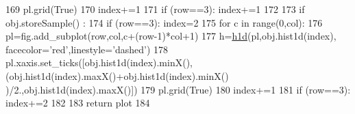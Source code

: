 \begin{DoxyCode}
169             pl.grid(\textcolor{keyword}{True})
170             index+=1
171             \textcolor{keywordflow}{if} (row==3): index+=1
172 
173     \textcolor{keywordflow}{if} obj.storeSample() : 
174         \textcolor{keywordflow}{if} (row==3): index=2
175         \textcolor{keywordflow}{for} c \textcolor{keywordflow}{in} range(0,col):
176             pl=fig.add\_subplot(row,col,c+(row-1)*col+1)     
177             h=\hyperlink{namespaceplotter_a5d9521541ff0c72bf439078efacf2f42}{h1d}(pl,obj.hist1d(index), facecolor=\textcolor{stringliteral}{'red'},linestyle=\textcolor{stringliteral}{'dashed'})
178             pl.xaxis.set\_ticks([obj.hist1d(index).minX(),(obj.hist1d(index).maxX()+obj.hist1d(index).minX()
      )/2.,obj.hist1d(index).maxX()])
179             pl.grid(\textcolor{keyword}{True})
180             index+=1
181             \textcolor{keywordflow}{if} (row==3): index+=2
182 
183     \textcolor{keywordflow}{return} plot
184 \end{DoxyCode}
